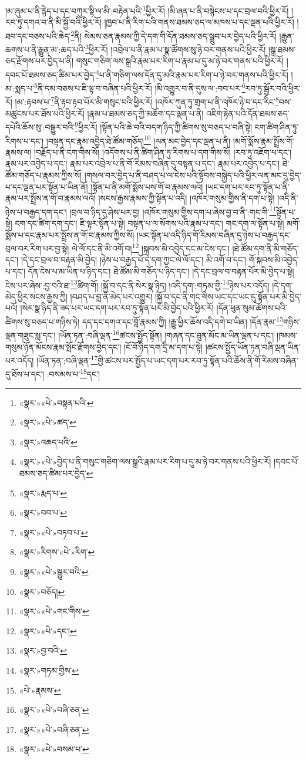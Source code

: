 །མ་ཞུམ་པ་ནི་རྙེད་པ་དང་བཀུར་སྟི་ལ་མི་:བརྟེན་པའི་\footnote{«སྣར་»«པེ་»བསྟན་པའི་}ཕྱིར་རོ། །མི་ཞན་པ་ནི་བསྙེངས་པ་དང་བྲལ་བའི་ཕྱིར་རོ། །རབ་ཏུ་དགའ་བ་ནི་མི་སྐྱོ་བའི་ཕྱིར་རོ། །ཁྱབ་པ་ནི་རིག་པའི་གནས་ཐམས་ཅད་ལ་མཁས་པ་དང་ལྡན་པའི་ཕྱིར་རོ། །ཐབ་དང་བཅས་པའི་ཆེད་\footnote{«སྣར་»«པེ་»ཚད་}ནི། སེམས་ཅན་རྣམས་ཀྱི་དེ་དག་གི་དོན་ཐམས་ཅད་སྒྲུབ་པར་བྱེད་པའི་ཕྱིར་རོ། །རྒྱུན་ཆགས་པ་ནི་རྒྱུན་མ་:ཆད་པའི་\footnote{«སྣར་»འཆད་པའི་}ཕྱིར་རོ། །འབྲེལ་པ་ནི་རྣམ་པ་སྣ་ཚོགས་སུ་ཉེ་བར་གནས་པའི་ཕྱིར་རོ། །སྒྲ་ཐམས་ཅད་རྫོགས་པར་བྱེད་པ་ནི། གསུང་གཅིག་ལས་སྒྲའི་རྣམ་པར་རིག་པ་རྣམ་པ་དུ་མ་ཉེ་བར་གནས་པའི་ཕྱིར་རོ། །
དབང་པོ་ཐམས་ཅད་ཚིམ་པར་བྱེད་\footnote{«སྣར་»«པེ་»བྱེད་པ་ནི་གསུང་གཅིག་ལས་སྒྲའི་རྣམ་པར་རིག་པ་དུ་མ་ཉེ་བར་གནས་པའི་ཕྱིར་རོ། །དབང་པོ་ཐམས་ཅད་ཚིམ་པར་བྱེད་}པ་ནི་གཅིག་ལས་དོན་དུ་མའི་རྣམ་པར་རིག་པ་ཉེ་བར་གནས་པའི་ཕྱིར་རོ། །མ་:སྨད་པ་\footnote{«སྣར་»རྨད་པ་}ནི་དམ་བཅས་པ་ཇི་ལྟ་བ་བཞིན་པའི་ཕྱིར་རོ། །མི་འགྱུར་བ་ནི་དུས་ལ་:བབ་པར་\footnote{«སྣར་»བབ་པ་}རབ་ཏུ་སྦྱོར་བའི་ཕྱིར་རོ། །མ་:རྟབས་པ་\footnote{«སྣར་»«པེ་»བཏབ་པ་}ནི་རྟབ་རྟབ་པོར་མི་གསུང་བའི་ཕྱིར་རོ། །འཁོར་ཀུན་ཏུ་གྲག་པ་ནི་འཁོར་ཉེ་བ་དང་རིང་\footnote{«སྣར་»རིགས་«པེ་»རིག་}བས་མཚུངས་པར་ཐོས་པའི་ཕྱིར་རོ། །རྣམ་པ་ཐམས་ཅད་ཀྱི་མཆོག་དང་ལྡན་པ་ནི། འཇིག་རྟེན་པའི་དོན་ཐམས་ཅད་དཔེའི་ཆོས་སུ་:བསྒྱུར་བའི་\footnote{«སྣར་»«པེ་»སྒྱུར་བའི་}ཕྱིར་རོ། །སྟོན་པའི་ཆེ་བའི་བདག་ཉིད་ཀྱི་ཚིགས་སུ་བཅད་པ་བཞི་སྟེ། ངག་ཚིག་ཤིན་ཏུ་རིགས་པ་དང་། །བསྟན་དང་རྣམ་འབྱེད་ཐེ་ཚོམ་གཅོད།\footnote{«སྣར་»བཅོད།} །ལན་མང་བྱེད་དང་ལྡན་པ་ནི། །མགོ་སྨོས་རྣམ་སྤྲོས་གོ་རྣམས་ལ། །བརྗོད་པ་ནི་ངག་གིས་སོ། །འདོགས་པ་ནི་ཚིག་ཤིན་ཏུ་རིགས་པ་དག་གིས་སོ། །རབ་ཏུ་འཇོག་པ་དང་། རྣམ་པར་འབྱེད་པ་དང་། རྣམ་པར་འབྲེལ་པ་ནི་གོ་རིམས་བཞིན་དུ་བསྟན་པ་དང་། རྣམ་པར་འབྱེད་པ་དང་། ཐེ་ཚོམ་གཅོད་པ་རྣམས་ཀྱིས་སོ། །གསལ་བར་བྱེད་པ་ནི་བཤད་པ་ལ་ངེས་པའི་སྟོབས་བསྐྱེད་པའི་ཕྱིར་ལན་མང་དུ་བྱེད་པ་དང་ལྡན་པར་སྟོན་པ་ཡིན་ནོ། །སྟོན་པ་ནི་མགོ་སྨོས་པས་གོ་བ་རྣམས་ལའོ། །ཡང་དག་པར་རབ་ཏུ་སྟོན་པ་ནི་རྣམ་པར་སྤྲོས་ན་གོ་བ་རྣམས་ལའོ། །སངས་རྒྱས་རྣམས་ཀྱི་སྟོན་པ་འདི། །འཁོར་གསུམ་གྱིས་ནི་དག་པ་སྟེ། །འདི་ནི་ཉེས་པ་བརྒྱད་དག་དང་། །བྲལ་བ་ཉིད་དུ་ཤེས་པར་བྱ། །འཁོར་གསུམ་གྱིས་དག་པ་ཞེས་བྱ་བ་ནི་:གང་གི་\footnote{«སྣར་»«པེ་»གང་གིས་}སྟོན་པ་སྟེ། ངག་དང་ཚིག་དག་དང་། ཇི་ལྟར་སྟོན་པ་སྟེ། བསྟན་པ་ལ་སོགས་པའི་རྣམ་པ་དང་། གང་དག་ལ་སྟོན་པ་སྟེ། མགོ་སྨོས་པ་དང་རྣམ་པར་སྤྲོས་ན་གོ་བ་རྣམས་ཀྱིས་སོ། །ཡང་སྟོན་པ་འདི་ཉིད་གོ་རིམས་བཞིན་དུ་ཉེས་པ་བརྒྱད་དང་བྲལ་བར་རིག་པར་བྱ་སྟེ། ལེ་ལོ་དང་ནི་མི་འགོ་བ།\footnote{«སྣར་»«པེ་»དང་།} །སྐབས་མི་འབྱེད་དང་མ་ངེས་དང་། །ཐེ་ཚོམ་དག་ནི་མི་གཅོད་དང་། །དེ་དང་བྲལ་བ་བརྟན་མི་བྱེད། །ཉེས་པ་བརྒྱད་པོ་དེ་དག་ཀྱང་ལེ་ལོ་དང་། མི་འགོ་བ་དང་། གོ་སྐབས་མི་འབྱེད་པ་དང་། དོན་ངེས་པ་མ་ཡིན་པ་ཉིད་དང་། ཐེ་ཚོམ་མི་གཅོད་པ་ཉིད་དང་། །དེ་དང་བྲལ་བ་བརྟན་པོར་མི་བྱེད་པ་སྟེ། ངེས་པར་ཞེས་:བྱ་བའི་ཐ་\footnote{«སྣར་»བྱ་བའི་}ཚིག་གོ། །སྐྱོ་བ་དང་ནི་སེར་སྣ་ཉིད། །འདི་དག་:གཏམ་གྱི་\footnote{«སྣར་»གཏམ་གྱིས་}ཉེས་པར་འདོད། །དེ་དག་མེད་ཕྱིར་སངས་རྒྱས་ཀྱི། །བཤད་པ་བླ་ན་མེད་པར་འགྱུར། །སྐྱོ་བ་དང་ནི་གང་གིས་ཡང་དང་ཡང་དུ་སྟོན་པར་མི་བྱེད་པའོ། །སེར་སྣ་ཉིད་ནི་ཟད་པར་ཡང་དག་པར་རབ་ཏུ་སྟོན་པར་མི་བྱེད་པའི་ཕྱིར་རོ། །དོན་ཕུན་སུམ་ཚོགས་པའི་ཚིགས་སུ་བཅད་པ་གཉིས་ཏེ། དད་དང་དགའ་དང་བློ་རྣམས་ཀྱི། །རྒྱུ་ཕྱིར་ཆོས་འདི་དགེ་བ་ཡིན། །དོན་རྣམ་\footnote{«པེ་»རྣམས་}གཉིས་ལྡན་གཟུང་སླ་དང་། །ཡོན་ཏན་:བཞི་ལྡན་\footnote{«སྣར་»«པེ་»བཞི་ཅན་}ཚངས་སྤྱོད་སྟོན། །གཞན་དང་ཐུན་མོང་མ་ཡིན་ལྡན་པ་དང་། །ཁམས་གསུམ་ཉོན་མོངས་རྣམ་སྤོང་རྫོགས་བྱེད་དང་། །ངོ་བོ་ཉིད་དག་དྲི་མ་དག་པ་སྟེ། །ཚངས་སྤྱོད་ཡོན་ཏན་བཞི་ལྡན་ཡིན་པར་འདོད། །ཡོན་ཏན་:བཞི་ལྡན་\footnote{«སྣར་»«པེ་»བཞི་ཅན་}གྱི་ཚངས་པར་སྤྱོད་པ་ཡང་དག་པར་རབ་ཏུ་སྟོན་པའི་ཆོས་ནི་གོ་རིམས་བཞིན་དུ་ཐོས་པ་དང་། :བསམས་པ་\footnote{«སྣར་»«པེ་»བསམ་པ་}དང་། 